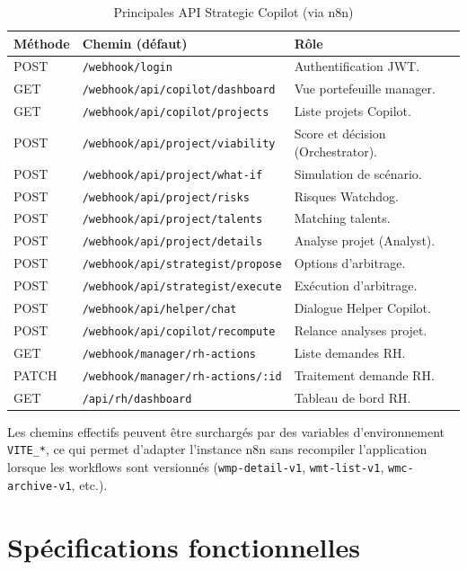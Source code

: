 \begin{table}[htbp]
\centering
\caption{Principales API Strategic Copilot (via n8n)}
\label{tab:apis-ch3}
\begin{tabular}{@{}llp{5.8cm}@{}}
\toprule
\textbf{Méthode} & \textbf{Chemin (défaut)} & \textbf{Rôle} \\
\midrule
POST & \texttt{/webhook/login} & Authentification JWT. \\
GET & \texttt{/webhook/api/copilot/dashboard} & Vue portefeuille manager. \\
GET & \texttt{/webhook/api/copilot/projects} & Liste projets Copilot. \\
POST & \texttt{/webhook/api/project/viability} & Score et décision (Orchestrator). \\
POST & \texttt{/webhook/api/project/what-if} & Simulation de scénario. \\
POST & \texttt{/webhook/api/project/risks} & Risques Watchdog. \\
POST & \texttt{/webhook/api/project/talents} & Matching talents. \\
POST & \texttt{/webhook/api/project/details} & Analyse projet (Analyst). \\
POST & \texttt{/webhook/api/strategist/propose} & Options d'arbitrage. \\
POST & \texttt{/webhook/api/strategist/execute} & Exécution d'arbitrage. \\
POST & \texttt{/webhook/api/helper/chat} & Dialogue Helper Copilot. \\
POST & \texttt{/webhook/api/copilot/recompute} & Relance analyses projet. \\
GET & \texttt{/webhook/manager/rh-actions} & Liste demandes RH. \\
PATCH & \texttt{/webhook/manager/rh-actions/:id} & Traitement demande RH. \\
GET & \texttt{/api/rh/dashboard} & Tableau de bord RH. \\
\bottomrule
\end{tabular}
\end{table}

Les chemins effectifs peuvent être surchargés par des variables d'environnement \texttt{VITE\_*}, ce qui permet d'adapter l'instance n8n sans recompiler l'application lorsque les workflows sont versionnés (\texttt{wmp-detail-v1}, \texttt{wmt-list-v1}, \texttt{wmc-archive-v1}, etc.).

\section{Spécifications fonctionnelles}

